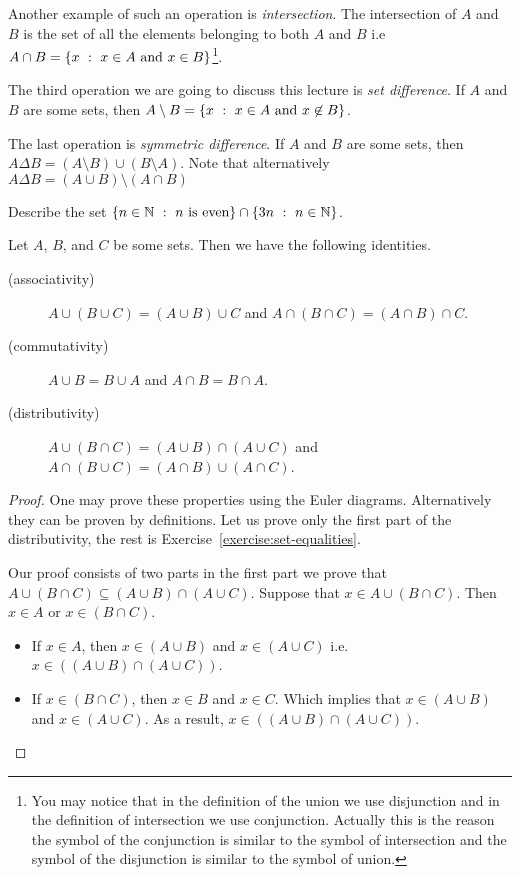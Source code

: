 Another example of such an operation is \emph{intersection}. The
intersection of $A$ and $B$ is the set of all the elements belonging to both
$A$ and $B$ i.e $A \cap B = \set[x \in A \text{ and } x \in B]{x}$\footnote{%
  You may notice that in the definition of the union we use disjunction and
  in the definition of intersection we use conjunction. Actually this is the
  reason the symbol of the conjunction is similar to the symbol of intersection
  and the symbol of the disjunction is similar to the symbol of union.
}.

The third operation we are going to discuss this lecture is
\emph{set difference}. If $A$ and $B$ are some sets, then
$A \setminus B = \set[x \in A \text{ and } x \not\in B]{x}$.

The last operation is \emph{symmetric difference}. If $A$ and $B$ are some
sets, then $A \Delta B = (A \setminus B) \cup (B \setminus A)$. Note that
alternatively $A \Delta B = (A \cup B) \setminus (A \cap B)$

\begin{exercise}
  Describe the set
  $\set[n \text{ is even}]{n \in \N} \cap \set[n \in \N]{3n}$.
\end{exercise}

\begin{theorem}
\label{theorem:set-equalities}
  Let $A$, $B$, and $C$ be some sets. Then we have the following identities.
  \begin{description}
    \item[(associativity)] $A \cup (B \cup C) = (A \cup B) \cup C$ and
      $A \cap (B \cap C) = (A \cap B) \cap C$.
    \item[(commutativity)] $A \cup B = B \cup A$ and $A \cap B = B \cap A$.
    \item[(distributivity)] $A \cup (B \cap C) = (A \cup B) \cap (A \cup C)$
      and $A \cap (B \cup C) = (A \cap B) \cup (A \cap C)$.
  \end{description}
\end{theorem}
\begin{proof}
  One may prove these properties using the Euler diagrams. Alternatively they
  can be proven by definitions. Let us prove only the first part of the
  distributivity, the rest is Exercise~\ref{exercise:set-equalities}.

  Our proof consists of two parts in the first part we prove that
  $A \cup (B \cap C) \subseteq (A \cup B) \cap (A \cup C)$.
  Suppose that $x \in A \cup (B \cap C)$. Then $x \in A$ or $x \in (B \cap C)$.
  \begin{itemize}
    \item If $x \in A$, then $x \in (A \cup B)$ and $x \in (A \cup C)$ i.e.
      $x \in ((A \cup B) \cap (A \cup C))$.
    \item If $x \in (B \cap C)$, then $x \in B$ and $x \in C$. Which implies
      that $x \in (A \cup B)$ and $x \in (A \cup C)$. As a result,
      $x \in ((A \cup B) \cap (A \cup C))$.
  \end{itemize}
\end{proof}

